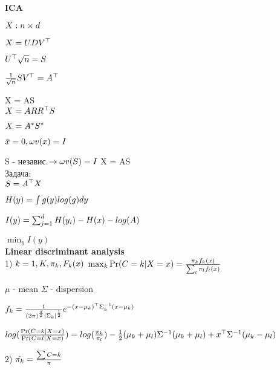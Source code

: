 \documentclass[11pt]{article}
\begin{document}
\textbf{ICA}

$ X: n \times d \\ $

$ X = UDV^{\top} \\ $

$ U^{\top} \sqrt{n} = S \\ $

$\frac{1}{\sqrt{n}}SV^{\top} = A^{\top} \\$

X = AS \\

$X = ARR^{\top}S \\$

$ X = A^{*}S^{*} \\ $

$\bar{x} = 0, \omega v(x) = I \\$

S - независ.$ \rightarrow \omega v(S) = I \\$
X = AS \\

Задача: \\
$S = A^{\top}X\\$

$H(y) = \int g(y) log(g) dy \\$

$I(y) = \sum_{j=1}^d H(y_i) - H(x) - log(A) \\$

$\min_{y} I(y)$ \\



 \textbf{Linear discriminant analysis} \\

1) $k=1, K, \pi_k, F_k(x) \\ $
$ \max_{k} \Pr(C=k|X=x) = \frac{\pi_k f_k(x)}{\sum_{l} \pi_l f_l(x)} \\$
 
 $\mu$ - mean
 $\Sigma$ - dispersion

 $f_k=\frac{1}{(2\pi)^{\frac{d}{2}} \mid \Sigma_k \mid ^{\frac{1}{2}}} e^{-(x - \mu_k)^{\top} \Sigma_k^{-1}(x- \mu_k)} \\$

 $log (\frac{\Pr(C=k|X=x)}{\Pr(C=l|X=x)}) = log({\frac{\pi_k}{\pi_l}}) - \frac{1}{2}(\mu_k + \mu_l)\Sigma^{-1}(\mu_k + \mu_l) + x^{\top}\Sigma^{-1}(\mu_k - \mu_l) \\$

 2) $\hat{\pi_k} = \frac{\sum C=k}{\pi} \\ $
 
\end{document}
